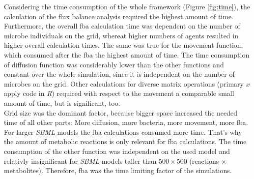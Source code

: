 Considering the time consumption of the whole framework (Figure \hyperref[fig:time]{\ref{fig:time}}), the calculation of the flux balance analysis required the highest amount of time.
Furthermore, the overall fba calculation time was dependent on the number of microbe individuals on the grid, whereat higher numbers of agents resulted in higher overall calculation times. The same was true for the movement function, which consumed after the fba the highest amount of time. The time consumption of diffusion function was considerably lower than the other functions and constant over the whole simulation, since it is independent on the number of microbes on the grid. Other
calculations for diverse matrix operations (primary $x$apply code in \textit{R}) required with respect to the movement a comparable small amount of time, but is significant, too.\\
Grid size was the dominant factor, because bigger space increased the needed time of all other parts: More diffusion, more bacteria, more movement, more fba.
For larger \textit{SBML} models the fba calculations consumed more time.
That's why the amount of metabolic reactions is only relevant for fba calculations.
The time consumption of the other function was independent on the used model and relativly insignificant for \textit{SBML} models taller than $500\times 500$ (reactions $\times$ metabolites).
Therefore, fba was the time limiting factor of the simulations.

